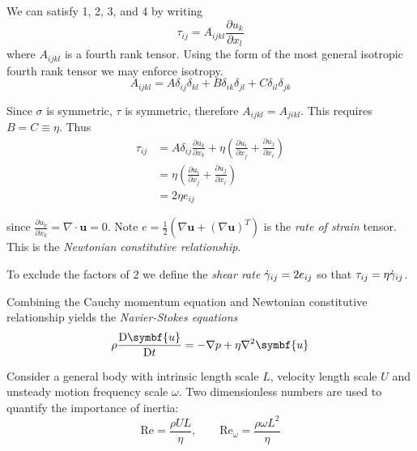 \documentclass{jknotes}
\begin{document}
We can satisfy 1, 2, 3, and 4 by writing
\begin{equation}
	\tau_{ij} = A_{ijkl}\frac{\partial u_k}{\partial x_l}
\end{equation}
where $A_{ijkl}$ is a fourth rank tensor. Using the form of the most general
isotropic fourth rank tensor we may enforce isotropy.
\begin{equation}
	A_{ijkl} = A \delta_{ij} \delta_{kl} + B \delta_{ik}\delta_{jl} + C
	\delta_{il}\delta_{jk}
\end{equation}

Since $\sigma$ is symmetric, $\tau$ is symmetric, therefore $A_{ijkl} =
A_{jikl}$. This requires $B = C \equiv \eta$. Thus
\begin{equation}
	\begin{aligned}
		\tau_{ij} &= A\delta_{ij} \frac{\partial u_k}{\partial x_k} + \eta
		\left( \frac{\partial u_i}{\partial x_j} + \frac{\partial
		u_j}{\partial x_i} \right) \\
		&= \eta \left( \frac{\partial u_i}{\partial x_j} + \frac{\partial
		u_j}{\partial x_i} \right) \\
		&= 2 \eta e_{ij}
	\end{aligned}
\end{equation}

since $\frac{\partial u_k}{\partial x_k} = \nabla \cdot \symbf{u} = 0$. Note
$e = \frac{1}{2}\left(\nabla \symbf{u} + (\nabla \symbf{u})^T\right)$ is the
\emph{rate of strain} tensor. This is the \emph{Newtonian constitutive
	relationship}. 
	
\begin{defn}
	To exclude the factors of $2$ we define the \emph{shear rate}
	$\dot{\gamma}_{ij} = 2 e_{ij}$ so that $\tau_{ij} = \eta
	\dot{\gamma}_{ij}$.
\end{defn}

Combining the Cauchy momentum equation and Newtonian constitutive relationship
yields the \emph{Navier-Stokes equations}
\begin{equation}
	\rho \frac{\diffD{\symbf{u}}}{\diffD{t}} = - \nabla p + \eta \nabla^2 \symbf{u}
\end{equation}

Consider a general body with intrinsic length scale $L$, velocity length scale
$U$ and unsteady motion frequency scale $\omega$. Two dimensionless numbers
are used to quantify the importance of inertia:
\begin{equation}
	\text{Re} = \frac{\rho U L}{\eta}, \hspace{2em} \text{Re}_\omega =
	\frac{\rho \omega L^2}{\eta}
\end{equation}
\end{document}
